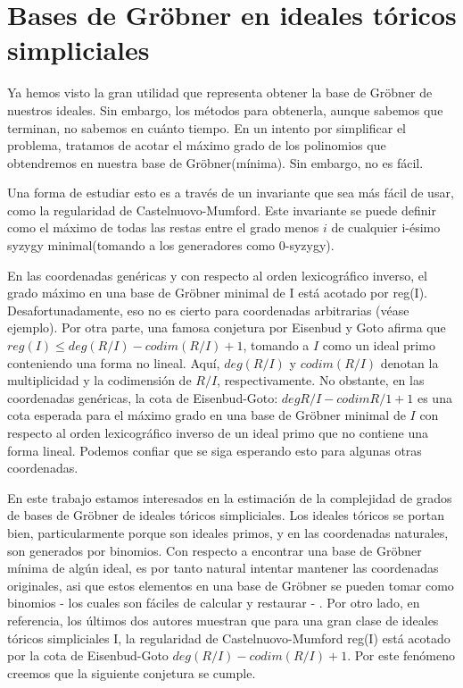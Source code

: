 \chapter{Bases de Gröbner en ideales tóricos simpliciales}

Ya hemos visto la gran utilidad que representa obtener la base de Gröbner de nuestros ideales. Sin embargo, los métodos para obtenerla, aunque sabemos que terminan, no sabemos en cuánto tiempo. En un intento por simplificar el problema, tratamos de acotar el máximo grado de los polinomios que obtendremos en nuestra base de Gröbner(mínima). Sin embargo, no es fácil.

Una forma de estudiar esto es a través de un invariante que sea más fácil de usar, como la regularidad de Castelnuovo-Mumford. Este invariante se puede definir como el máximo de todas las restas entre el grado menos $i$ de cualquier i-ésimo syzygy minimal(tomando a los generadores como 0-syzygy).

En las coordenadas genéricas y con respecto al orden lexicográfico inverso, el grado máximo en una base de Gröbner minimal de I está acotado por reg(I). Desafortunadamente, eso no es cierto para coordenadas arbitrarias (véase ejemplo). Por otra parte, una famosa conjetura por Eisenbud y Goto afirma que $reg(I) \leq deg(R/I) - codim(R/I) + 1$, tomando a $I$ como un ideal primo conteniendo una forma no lineal. Aquí, $deg(R/I)$ y $codim(R/I)$ denotan la multiplicidad y la codimensión de $R/I$, respectivamente. No obstante, en las coordenadas genéricas, la cota de Eisenbud-Goto: $deg{R/I} - codim{R/1} + 1$ es una cota esperada para el máximo grado en una base de Gröbner minimal de $I$ con respecto al orden lexicográfico inverso de un ideal primo que no contiene una forma lineal. Podemos confiar que se siga esperando esto para algunas otras coordenadas.

En este trabajo estamos interesados en la estimación de la complejidad de grados de bases de Gröbner de ideales tóricos simpliciales. Los ideales tóricos se portan bien, particularmente porque son ideales primos, y en las coordenadas naturales, son generados por binomios. Con respecto a encontrar una base de Gröbner mínima de algún ideal, es por tanto natural intentar mantener las coordenadas originales, asi que estos elementos en una base de Gröbner se pueden tomar como binomios - los cuales son fáciles de calcular y restaurar - . Por otro lado, en {referencia}, los últimos dos autores muestran que para una gran clase de ideales tóricos simpliciales I, la regularidad de Castelnuovo-Mumford reg(I) está acotado por la cota de Eisenbud-Goto $deg(R/I) - codim(R/I) + 1$. Por este fenómeno creemos que la siguiente conjetura se cumple.

